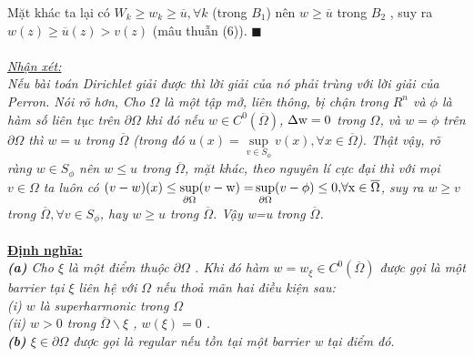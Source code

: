 Mặt khác ta lại có $W_k\ge w_k\ge \overline u,\forall k$ (trong $B_1$) nên $w\ge \overline u$ trong $B_2$ , suy ra $w(z)\ge\overline u(z)> v(z)$  (mâu thuẫn (6)). $\blacksquare$
\\
\\
\textit{\underline {Nhận xét:}}\\
{\it Nếu bài toán Dirichlet giải được thì lời giải của nó phải trùng với lời giải của Perron. Nói rõ hơn, Cho $\Omega$ là một tập mở, liên thông, bị chận trong $R^n$ và $\phi$ là hàm số liên tục trên 
$\partial \Omega $ khi đó nếu $w\in C^0(\overline \Omega)$, $\Delta {\rm{w}} = 0$ trong $\Omega$, và $w=\phi$ trên $\partial \Omega$ thì $w=u$ trong $\overline\Omega$ (trong đó  $u(x) = \mathop {\sup }\limits_{v \in S_\phi  } v(x),\forall x\in \overline\Omega$). Thật vậy, rõ ràng $w \in S_\phi$ nên $w\le u$ trong $\overline\Omega$, mặt khác, theo nguyên lí cực đại thì với mọi $v\in \Omega$ ta luôn có $(v-w)(x)\le\mathop {\sup }\limits_{\partial \Omega } (v - {\rm{w) = }}\mathop {\sup }\limits_{\partial \Omega } (v - \phi {\rm{)}} \le {\rm{0,}}\forall {\rm{x}} \in \overline\Omega $, suy ra $w\ge v$ trong $\overline\Omega,\forall v\in S_\phi$, hay $w\ge u$ trong $\overline\Omega$. Vậy w=u trong $\overline\Omega$.}
\\
\\
{\bf \underline{Định nghĩa:}}
\\{\it
{\bf (a)} Cho $\xi$ là một điểm thuộc $\partial \Omega $ . Khi đó hàm $w = {w_\xi } \in {C^0}\left( {\overline \Omega  } \right)$ được gọi là một barrier tại $\xi $ liên hệ với $\Omega $ nếu thoả mãn hai điều kiện sau:\\
(i)       $w$ là superharmonic trong $\Omega $ \\
(ii)       $w > 0$ trong $\overline \Omega  \backslash \xi $ , $w\left( \xi  \right) = 0$ .\\
{\bf (b)} $\xi \in \partial \Omega$ được gọi là regular nếu tồn tại một barrier w tại điểm đó.}
\\


